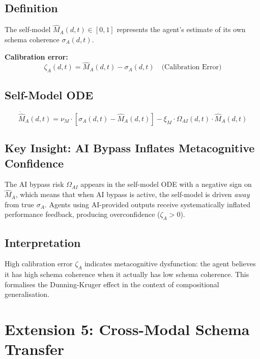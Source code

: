 \documentclass[11pt,a4paper]{article}
\begin{document}
\subsection{Definition}

The self-model $\hat{M}_A(d,t) \in [0,1]$ represents the agent's
estimate of its own schema coherence $\sigma_A(d,t)$.

\textbf{Calibration error:}
\begin{equation}\label{app:eq:calibration-error}
\zeta_A(d,t) = \hat{M}_A(d,t) - \sigma_A(d,t) \quad \text{(Calibration Error)}
\end{equation}

\subsection{Self-Model ODE}

\begin{equation}\label{app:eq:self-model-ode}
\dot{\hat{M}}_A(d,t) = \nu_M \cdot [\sigma_A(d,t) - \hat{M}_A(d,t)] - \xi_M \cdot \Omega_{AI}(d,t) \cdot \hat{M}_A(d,t)
\end{equation}

\subsection{Key Insight: AI Bypass Inflates Metacognitive Confidence}

The AI bypass risk $\Omega_{AI}$ appears in the self-model ODE with
a negative sign on $\hat{M}_A$, which means that when AI bypass is
active, the self-model is driven \emph{away} from true $\sigma_A$.
Agents using AI-provided outputs receive systematically inflated
performance feedback, producing overconfidence ($\zeta_A > 0$).

\subsection{Interpretation}

High calibration error $\zeta_A$ indicates metacognitive dysfunction:
the agent believes it has high schema coherence when it actually has
low schema coherence. This formalises the Dunning-Kruger effect in
the context of compositional generalisation.

\section{Extension 5: Cross-Modal Schema Transfer}\label{app:multimodal}
\end{document}

